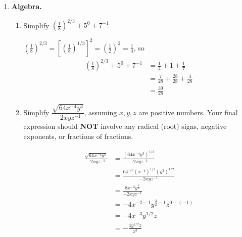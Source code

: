 \documentclass{article}
\theoremstyle{theorem}
\begin{document}
\begin{enumerate}
\item {} \textbf{Algebra.} 

  \begin{enumerate}
  \item 

    \begin{problem}[\stretch{0.5}]
      Simplify $\left(\frac{1}{8}\right)^{2/3} + 5^0 + 7^{-1}$
    \end{problem}

    \begin{solution}
      $\displaystyle \left(\frac{1}{8}\right)^{2/3} = \left[\left( \frac{1}{8} \right)^{1/3} \right]^2 = \left( \frac{1}{2} \right)^2 = \frac{1}{4}$, so
      \begin{align*}
        \left(\frac{1}{8}\right)^{2/3} + 5^0 + 7^{-1} &= \frac{1}{4} + 1 + \frac{1}{7} \\
        &= \frac{7}{28} + \frac{28}{28} + \frac{4}{28} \\
        &= \boxed{\frac{39}{28}}
      \end{align*}
    \end{solution}

  \item  %

    \begin{problem}[\vfill]
      Simplify $\dfrac{\sqrt{64 x^{-4}y^{3}}}{-2xyz^{-1}}$, assuming $x, y, z$ are positive numbers. Your final expression should \textbf{NOT} involve any radical (root) signs, negative exponents, or fractions of fractions.
    \end{problem}

    \begin{solution}
      \begin{align*}
        \frac{\sqrt{64 x^{-4}y^{3}}}{-2xyz^{-1}}  &=
        \frac{ \left( 64 x^{-4}y^{3} \right)^{1/2}}{-2xyz^{-1}} \\ 
        &= \frac{64^{1/2} (x^{-4})^{1/2} (y^3)^{1/2} }{-2xyz^{-1}} \\      
        &= \frac{8 x^{-2}y^{\frac{3}{2}}}{-2xyz^{-1}}\\
        &= -4 x^{-2 - 1} y^{\frac{3}{2} - 1} z^{0 - (-1)} \\
        &= -4 x^{-3} y^{1/2} z \\
        &= \boxed{-\frac{4 y^{1/2} z}{x^3}}
      \end{align*}
    \end{solution}


\end{enumerate}
\end{enumerate}
\end{document}
